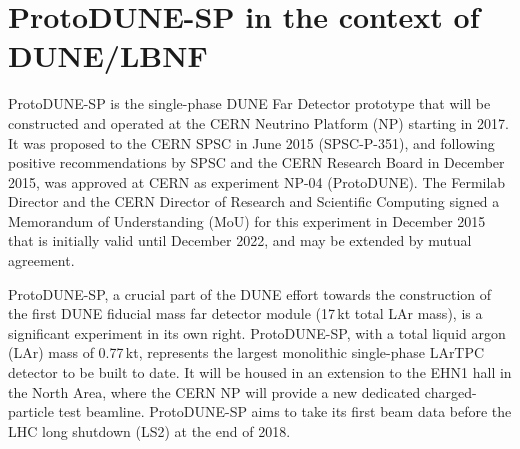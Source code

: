 



\section{ProtoDUNE-SP in the context of DUNE/LBNF}

ProtoDUNE-SP is the single-phase DUNE Far Detector prototype that will be constructed and operated at the CERN Neutrino Platform (NP) starting in 2017. It was proposed to the CERN SPSC in June 2015 (SPSC-P-351), and following positive recommendations by SPSC and the CERN Research Board in December 2015, was approved at CERN as experiment NP-04 (ProtoDUNE). The Fermilab Director and the CERN Director of Research and Scientific Computing signed a Memorandum of Understanding (MoU) for this experiment in December 2015 that is initially valid until December 2022, %
and may be extended by mutual agreement. 



ProtoDUNE-SP, a crucial part of the DUNE effort towards the construction of the first DUNE  fiducial mass far detector module (17\,kt total LAr mass), is a significant experiment in its own right. ProtoDUNE-SP, with a total liquid argon (LAr) mass of 0.77\,kt, represents the largest monolithic single-phase LArTPC detector to be built to date. %
It will be housed in an extension to the EHN1 hall in the North Area, where the CERN NP will provide a new dedicated charged-particle test beamline. ProtoDUNE-SP aims to take its first beam data before the LHC long shutdown (LS2) at the end of 2018.

